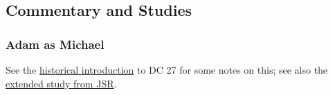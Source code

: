 
	
	
	
	
\subsection{Commentary and Studies} %
	\label{ADAM-COMMENTARY}

	
		
	\subsubsection{Adam as Michael}
		\label{ADAM-michael}
		
		See the \hyperref[DC27-HB]{historical introduction} to DC 27 for some notes on this; see also the \hyperref[EXSS-DC27-JSR]{extended study from JSR}.